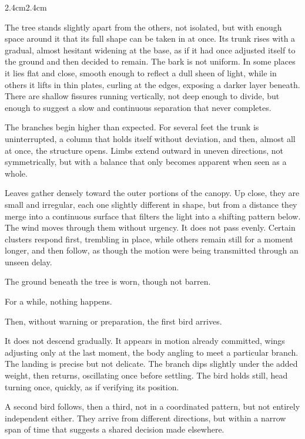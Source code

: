 \begin{adjustwidth}{2.4cm}{2.4cm}

The tree stands slightly apart from the others, not isolated, but with enough
space around it that its full shape can be taken in at once. Its trunk rises with
a gradual, almost hesitant widening at the base, as if it had once adjusted itself
to the ground and then decided to remain. The bark is not uniform. In some places
it lies flat and close, smooth enough to reflect a dull sheen of light, while in
others it lifts in thin plates, curling at the edges, exposing a darker layer beneath.
There are shallow fissures running vertically, not deep enough to divide, but enough
to suggest a slow and continuous separation that never completes.

The branches begin higher than expected. For several feet the trunk is uninterrupted,
a column that holds itself without deviation, and then, almost all at once, the
structure opens. Limbs extend outward in uneven directions, not symmetrically, but
with a balance that only becomes apparent when seen as a whole.

Leaves gather densely toward the outer portions of the canopy. Up close, they are
small and irregular, each one slightly different in shape, but from a distance they
merge into a continuous surface that filters the light into a shifting pattern below.
The wind moves through them without urgency. It does not pass evenly. Certain
clusters respond first, trembling in place, while others remain still for a moment
longer, and then follow, as though the motion were being transmitted through an
unseen delay.

The ground beneath the tree is worn, though not barren.

\vspace{2em}

For a while, nothing happens.

\vspace{2em}

Then, without warning or preparation, the first bird arrives.

It does not descend gradually. It appears in motion already committed, wings
adjusting only at the last moment, the body angling to meet a particular branch.
The landing is precise but not delicate. The branch dips slightly under the added
weight, then returns, oscillating once before settling. The bird holds still, head
turning once, quickly, as if verifying its position.

A second bird follows, then a third, not in a coordinated pattern, but not entirely
independent either. They arrive from different directions, but within a narrow span
of time that suggests a shared decision made elsewhere.


\end{adjustwidth}
